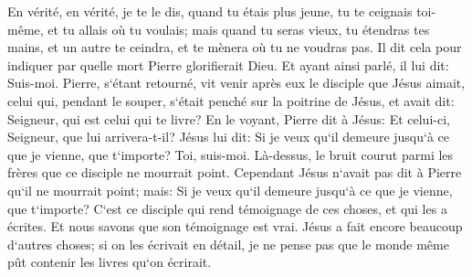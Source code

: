 \verse En vérité, en vérité, je te le dis, quand tu étais plus jeune, tu te ceignais toi-même, et tu allais où tu voulais; mais quand tu seras vieux, tu étendras tes mains, et un autre te ceindra, et te mènera où tu ne voudras pas. 
\verse Il dit cela pour indiquer par quelle mort Pierre glorifierait Dieu. Et ayant ainsi parlé, il lui dit: Suis-moi. 
\verse Pierre, s`étant retourné, vit venir après eux le disciple que Jésus aimait, celui qui, pendant le souper, s`était penché sur la poitrine de Jésus, et avait dit: Seigneur, qui est celui qui te livre? 
\verse En le voyant, Pierre dit à Jésus: Et celui-ci, Seigneur, que lui arrivera-t-il? 
\verse Jésus lui dit: Si je veux qu`il demeure jusqu`à ce que je vienne, que t`importe? Toi, suis-moi. 
\verse Là-dessus, le bruit courut parmi les frères que ce disciple ne mourrait point. Cependant Jésus n`avait pas dit à Pierre qu`il ne mourrait point; mais: Si je veux qu`il demeure jusqu`à ce que je vienne, que t`importe? 
\verse C`est ce disciple qui rend témoignage de ces choses, et qui les a écrites. Et nous savons que son témoignage est vrai. 
\verse Jésus a fait encore beaucoup d`autres choses; si on les écrivait en détail, je ne pense pas que le monde même pût contenir les livres qu`on écrirait. 
